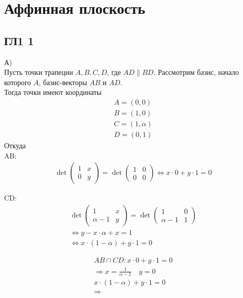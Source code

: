\newpage
	\section{Аффинная плоскость}
	\subsection{ГЛ1 1}
		А)\\
		Пусть точки трапеции $A, B, C, D$, где $AD \parallel BD$. Рассмотрим базис, начало которого $A$, базис-векторы $AB$ и $AD$.\\ 
		Тогда точки имеют координаты 
		\begin{gather*}
		A = (0,0)\\
		B = (1,0)\\
		C = (1,\alpha)\\
		D = (0,1)
		\end{gather*}
		Откуда\\
		AB: 
		\begin{gather*}
		\det 
		 \begin{pmatrix} 
				1 & x\\ 
				0 & y 
			\end{pmatrix} 
		= \det
			\begin{pmatrix} 
				1 & 0\\ 
				0 & 0 
			\end{pmatrix} 
		\Leftrightarrow x \cdot 0 + y \cdot 1 = 0
		\end{gather*}
		 
		CD:
		\begin{gather*}
		\det 
			\begin{pmatrix} 
				1 & x\\ 
				\alpha -1 & y 
			\end{pmatrix}
		= \det 
			\begin{pmatrix} 
				1 & 0\\ 
				\alpha -1 & 1 
			\end{pmatrix}\\
		\Leftrightarrow y - x \cdot \alpha + x = 1\\
		\Leftrightarrow x \cdot (1-\alpha) + y \cdot 1 = 0
		\end{gather*}
		 
		\begin{gather*}
		AB \cap CD: x \cdot 0 + y \cdot 1 = 0\\
		\Rightarrow x = \frac{1}{\alpha - 1} \quad y = 0\\
		x \cdot (1-\alpha) + y \cdot 1 = 0\\
		\Rightarrow
		\end{gather*}
		 
